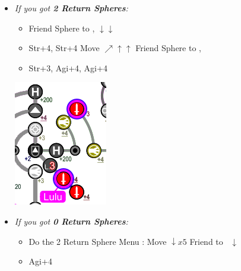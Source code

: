 \begin{spheregrid}
\begin{multicols}{2}
\begin{itemize}
\begin{itemize}
				\item \textit{If you got \textbf{2 Return Spheres}:}
				      \begin{itemize}
					      \item Friend Sphere to \lulu,  $\downarrow\downarrow$
					      \item Str+4, Str+4
					            \luluf Move $\nearrow\uparrow\uparrow$
					            \yunaf Friend Sphere to \lulu,
					      \item Str+3, Agi+4, Agi+4
				      \end{itemize}
				      \includegraphics[width=.4\columnwidth]{graphics/2_and_2}
				      \columnbreak
				\item \textit{If you got \textbf{0 Return Spheres}:}
				      \begin{itemize}
					      \item Do the 2 Return Sphere Menu
					            \rikkuf: Move $\downarrow x5$
					            \yunaf Friend to \rikku\ $\downarrow$
					      \item Agi+4

\end{itemize}
\end{itemize}
\end{itemize}
\end{multicols}
\end{spheregrid}
